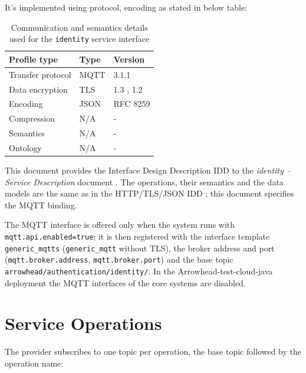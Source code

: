 \documentclass[a4paper]{arrowhead}
\begin{document}
It's implemented using protocol, encoding as stated in below table:
\begin{table}[ht!]
  \centering
  \begin{tabular}{|l|l|l|}
    \hline
    \rowcolor{gray!33} Profile type & Type & Version \\ \hline
    Transfer protocol & MQTT & 3.1.1 \cite{mqtt311} \\ \hline
    Data encryption & TLS & 1.3 \cite{rfc8446}, 1.2 \cite{rfc5246} \\ \hline
    Encoding & JSON & RFC 8259 \cite{rfc8259} \\ \hline
    Compression & N/A & - \\ \hline
    Semantics & N/A & - \\ \hline
    Ontology & N/A & - \\ \hline
  \end{tabular}
  \caption{Communication and semantics details used for the \texttt{identity} service interface}
  \label{tab:comunication_semantics_profile}
\end{table}

This document provides the Interface Design Description IDD to the \textit{identity -- Service Description} document \cite{auth-identity-sd}.
The operations, their semantics and the data models are the same as in the HTTP/TLS/JSON IDD \cite{auth-identity-http-idd}; this document specifies the MQTT binding.

The MQTT interface is offered only when the system runs with \texttt{mqtt.api.enabled=true}; it is then registered with the interface template \texttt{generic\_\allowbreak{}mqtts} (\texttt{generic\_\allowbreak{}mqtt} without TLS), the broker address and port (\texttt{mqtt.\allowbreak{}broker.\allowbreak{}address}, \texttt{mqtt.\allowbreak{}broker.\allowbreak{}port}) and the base topic \texttt{arrowhead/\allowbreak{}authentication/\allowbreak{}identity/\allowbreak{}}. In the Arrowhead-test-cloud-java deployment the MQTT interfaces of the core systems are disabled.

\newpage

\section{Service Operations}
\label{sec:operations}

The provider subscribes to one topic per operation, the base topic followed by the operation name:
\end{document}
